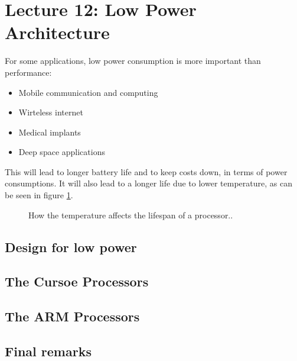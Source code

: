\section{Lecture 12: Low Power Architecture}
For some applications, low power consumption is more important than performance:
\begin{itemize}
\item Mobile communication and computing
\item Wirteless internet
\item Medical implants
\item Deep space applications 
\end{itemize}

This will lead to longer battery life and to keep costs down, in terms of power consumptions. It will also lead to a longer life due to lower temperature, as can be seen in figure \ref{fig:thermal-reliability}.

\begin{figure}[H]
	\centering
	\caption{How the temperature affects the lifespan of a processor..}
	\label{fig:thermal-reliability}
\end{figure}

\subsection{Design for low power }
\subsection{The Cursoe Processors}
\subsection{The ARM Processors}
\subsection{Final remarks}
